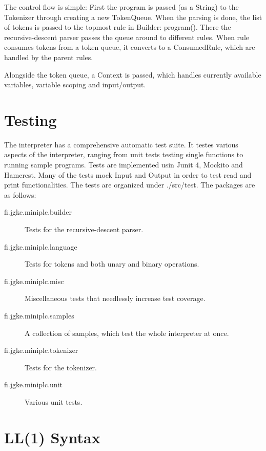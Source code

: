 \documentclass{article}
\begin{document}
The control flow is simple: First the program is passed (as a String) to
the Tokenizer through creating a new TokenQueue. When the parsing is done, the
list of tokens is passed to the topmost rule in Builder: program(). There the
recursive-descent parser passes the queue around to different rules. When rule
consumes tokens from a token queue, it converts to a ConsumedRule, which are
handled by the parent rules.

Alongside the token queue, a Context is passed, which handles currently
available variables, variable scoping and input/output.

\section{Testing}
The interpreter has a comprehensive automatic test suite. It testes various
aspects of the interpreter, ranging from unit tests testing single functions to
running sample programs. Tests are implemented usin Junit 4, Mockito and
Hamcrest. Many of the tests mock Input and Output in order to test read and
print functionalities. The tests are organized under ./src/test. The packages
are as follows:

\begin{description}
    \item[fi.jgke.miniplc.builder]
        Tests for the recursive-descent parser.

    \item[fi.jgke.miniplc.language]
        Tests for tokens and both unary and binary operations.

    \item[fi.jgke.miniplc.misc]
        Miscellaneous tests that needlessly increase test coverage.

    \item[fi.jgke.miniplc.samples]
        A collection of samples, which test the whole interpreter at once.

    \item[fi.jgke.miniplc.tokenizer]
        Tests for the tokenizer.

    \item[fi.jgke.miniplc.unit]
        Various unit tests.
\end{description}

\newpage

\section{LL(1) Syntax}
\end{document}
